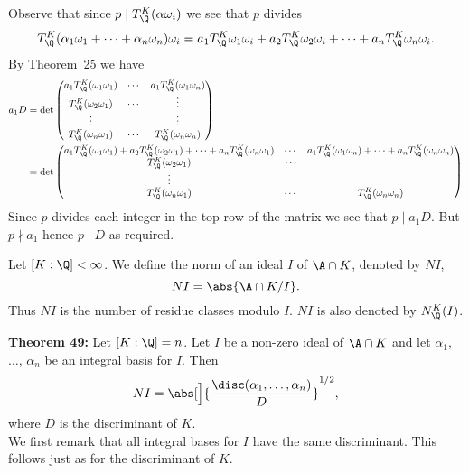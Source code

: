Observe that since $p\mid T_\Q^K(\alpha\omega_i)$ we see that $p$ divides \[ T_\Q^K(\alpha_1\omega_1+\dotsb+\alpha_n\omega_n)\omega_i = a_1T_\Q^K\omega_1\omega_i + a_2T_\Q^K\omega_2\omega_i + \dotsb + a_n T_\Q^K\omega_n\omega_i . \]
By Theorem~25 we have
\begin{align*}
a_1 D &= \det\begin{pmatrix}
a_1 T_\Q^K(\omega_1\omega_1) & \cdots & a_1 T_\Q^K(\omega_1\omega_n) \\
T_\Q^K(\omega_2\omega_1) & \cdots & \vdots \\
\vdots & & \vdots \\
T_\Q^K(\omega_n\omega_1) & \cdots & T_\Q^K(\omega_n\omega_n)
\end{pmatrix} \\
&= \det\begin{pmatrix}
a_1T_\Q^K(\omega_1\omega_1)+a_2T_\Q^K(\omega_2\omega_1)+\dotsb+a_nT_\Q^K(\omega_n\omega_1) & \cdots & a_1T_\Q^K(\omega_1\omega_n)+\dotsb+a_nT_\Q^K(\omega_n\omega_n) \\
T_\Q^K(\omega_2\omega_1) & \cdots \\
\vdots \\
T_\Q^K(\omega_n\omega_1) & \cdots & T_\Q^K(\omega_n\omega_n)
\end{pmatrix}
\end{align*}
Since $p$ divides each integer in the top row of the matrix we see that $p\mid a_1D$.  But $p\nmid a_1$ hence $p\mid D$ as required.

Let $[K:\Q]<\infty$.  We define the norm of an ideal $I$ of $\A\cap K$, denoted by $NI$,
\[ NI = \abs{\A\cap K/I} . \]
Thus $NI$ is the number of residue classes modulo $I$.  $NI$ is also denoted by $N_\Q^K(I)$.

\textbf{Theorem 49:} Let $[K:\Q]=n$.  %
Let $I$ be a non-zero ideal of $\A\cap K$ and let $\alpha_1$, $\dotsc$, $\alpha_n$ be an integral basis for $I$.  Then
\[ NI = \abs[\Big]{\frac{\disc(\alpha_1,\dotsc,\alpha_n)}{D}}^{1/2} , \]
where $D$ is the discriminant of $K$. \\
\pf We first remark that all integral bases for $I$ have the same discriminant.  This follows just as for the discriminant of $K$.

